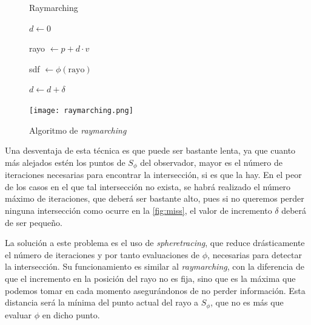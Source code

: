 \begin{figure}[ht!]
    \centering
    \begin{minipage}{0.50\textwidth}
        \begin{algorithm}[H]
            \caption{Raymarching}
                
                $d \gets 0$ 
                
                 {
                    rayo $\gets p +d\cdot v$
                    
                    sdf $\gets \phi(\text{rayo})$
                    
            
                    $d\gets d + \delta$\;
            
                }
        \end{algorithm}
    \end{minipage}%
    \hfill
    \begin{minipage}{0.48\textwidth}
        \texttt{[image: raymarching.png]}
    \end{minipage}
    \caption{Algoritmo de \textit{raymarching}}
    \label{a:raymarching}
\end{figure}

Una desventaja de esta técnica es que puede ser bastante lenta, ya que cuanto más alejados estén los puntos de $S_\phi$ del observador, mayor es el número de iteraciones necesarias para encontrar la intersección, si es que la hay. En el peor de los casos en el que tal intersección no exista, se habrá realizado el número máximo de iteraciones, que deberá ser bastante alto, pues si no queremos perder ninguna intersección como ocurre en la \autoref{fig:miss}, el valor de incremento $\delta$ deberá de ser pequeño.\newline

La solución a este problema es el uso de \textit{spheretracing}, que reduce drásticamente el número de iteraciones y por tanto evaluaciones de $\phi$, necesarias para detectar la intersección. Su funcionamiento es similar al \textit{raymarching}, con la diferencia de que el incremento en la posición del rayo no es fija, sino que es la máxima que podemos tomar en cada momento asegurándonos de no perder información. Esta distancia será la mínima del punto actual del rayo a $S_\phi$, que no es más que evaluar $\phi$ en dicho punto.\newline

